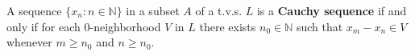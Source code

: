 A sequence $\{x_n : n \in \mathbb{N}\}$ in a subset $A$ of a t.v.s. $L$ is a \textbf{Cauchy sequence} if and only if for each $0$-neighborhood $V$ in $L$ there exists $n_0 \in \mathbb{N}$ such that $x_m - x_n \in V$ whenever $m \geq n_0$ and $n \geq n_0$.
